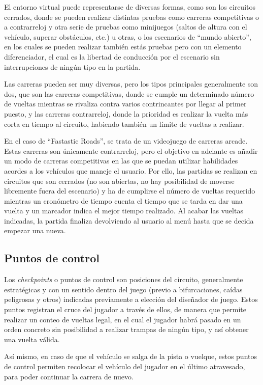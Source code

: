 El entorno virtual puede representarse de diversas formas, como son los circuitos cerrados, donde se pueden realizar distintas pruebas como carreras competitivas o a contrarreloj y otra serie de pruebas como minijuegos (saltos de altura con el vehículo, superar obstáculos, etc.) u otras, o los escenarios de ``mundo abierto'', en los cuales se pueden realizar también estás pruebas pero con un elemento diferenciador, el cual es la libertad de conducción por el escenario sin interrupciones de ningún tipo en la partida.

Las carreras pueden ser muy diversas, pero los tipos principales generalmente son dos, que son las carreras competitivas, donde se cumple un determinado número de vueltas mientras se rivaliza contra varios contrincantes por llegar al primer puesto, y las carreras contrarreloj, donde la prioridad es realizar la vuelta más corta en tiempo al circuito, habiendo también un límite de vueltas a realizar.

En el caso de ``Fastastic Roads'', se trata de un videojuego de carreras arcade. Estas carreras son únicamente contrarreloj, pero el objetivo en adelante es añadir un modo de carreras competitivas en las que se puedan utilizar habilidades acordes a los vehículos que maneje el usuario. Por ello, las partidas se realizan en circuitos que son cerrados (no son abiertas, no hay posibilidad de moverse libremente fuera del escenario) y ha de cumplirse el número de vueltas requerido mientras un cronómetro de tiempo cuenta el tiempo que se tarda en dar una vuelta y un marcador indica el mejor tiempo realizado. Al acabar las vueltas indicadas, la partida finaliza devolviendo al usuario al menú hasta que se decida empezar una nueva.

\subsection{Puntos de control}

Los \textit{checkpoints} o puntos de control son posiciones del circuito, generalmente estratégicas y con un sentido dentro del juego (previo a bifurcaciones, caídas peligrosas y otros) indicadas previamente a elección del diseñador de juego. Estos puntos registran el cruce del jugador a través de ellos, de manera que permite realizar un conteo de vueltas legal, en el cual el jugador habrá pasado en un orden concreto sin posibilidad a realizar trampas de ningún tipo, y así obtener una vuelta válida.

Así mismo, en caso de que el vehículo se salga de la pista o vuelque, estos puntos de control permiten recolocar el vehículo del jugador en el último atravesado, para poder continuar la carrera de nuevo.